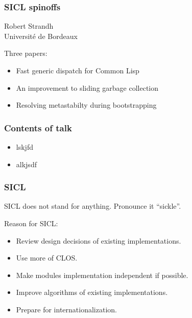 \documentclass{beamer}
\begin{document}
\begin{frame}
\frametitle{SICL spinoffs}

\begin{center}
Robert Strandh\\
Université de Bordeaux
\end{center}

Three papers:

\begin{itemize}
\item Fast generic dispatch for Common Lisp
\item An improvement to sliding garbage collection
\item Resolving metastabilty during bootstrapping
\end{itemize}

\end{frame}
\begin{frame}
\frametitle{Contents of talk}

\begin{itemize}
\item lskjfd
\item alkjsdf 
\end{itemize}
\end{frame}
\begin{frame}
\frametitle{SICL}

SICL does not stand for anything.  Pronounce it ``sickle''.

Reason for SICL:

\begin{itemize}
\item Review design decisions of existing implementations.
\item Use more of CLOS.
\item Make modules implementation independent if possible.
\item Improve algorithms of existing implementations. 
\item Prepare for internationalization. 
\end{itemize}
\end{frame}
\end{document}

